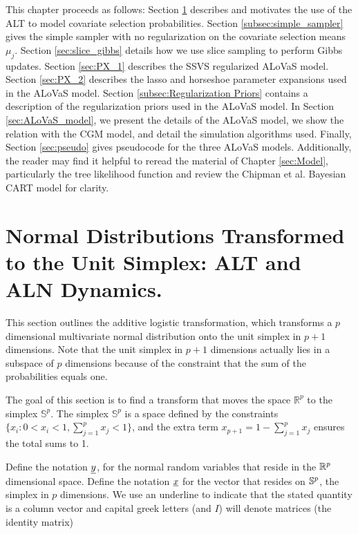This chapter proceeds as follows: Section \ref{sec:ALN_chapter} describes and motivates the use of the ALT to model covariate selection probabilities. Section \ref{subsec:simple_sampler} gives the simple sampler with no regularization on the covariate selection means $\mu_j$. Section \ref{sec:slice_gibbs} details how we use slice sampling to perform Gibbs updates. Section \ref{sec:PX_1} describes the SSVS regularized ALoVaS model. Section \ref{sec:PX_2} describes the lasso and horseshoe parameter expansions used in the ALoVaS model. Section \ref{subsec:Regularization Priors} contains a description of the regularization priors used in the ALoVaS model. In Section \ref{sec:ALoVaS_model}, we present the details of the ALoVaS model, we show the relation with the CGM model, and detail the simulation algorithms used. Finally, Section \ref{sec:pseudo} gives pseudocode for the three ALoVaS models. Additionally, the reader may find it helpful to reread the material of Chapter \ref{sec:Model}, particularly the tree likelihood function and review the Chipman et al. Bayesian CART \cite{chipman1998bayesian} model for clarity. 


\section{Normal Distributions Transformed to the Unit Simplex: ALT and ALN Dynamics. }\label{sec:ALN_chapter}

This section outlines the additive logistic transformation, which transforms a $p$ dimensional multivariate normal distribution onto the unit simplex in $p+1$ dimensions. Note that the unit simplex in $p+1$ dimensions actually lies in a subspace of $p$ dimensions because of the constraint that the sum of the probabilities equals one. 

The goal of this section is to find a transform that moves the space $\mathbb{R}^p$  to the simplex $\mathbb{S}^p$.  The simplex $\mathbb{S}^p$ is a space defined by the constraints $\{x_i: 0<x_i<1, \sum_{j=1}^px_j <1 \}$, and the extra term $x_{p+1}=1-\sum_{j=1}^p x_j$ ensures the total sums to 1.  

Define the notation $\underline{y}$, for the normal random variables that reside in the $\mathbb{R}^{p}$  dimensional space. Define the notation $\underline{x}$  for the vector that resides on $\mathbb{S}^{p}$, the simplex in $p$ dimensions. We use an underline to indicate that the stated quantity is a column vector and capital greek letters (and $I$) will denote matrices (the identity matrix) 

